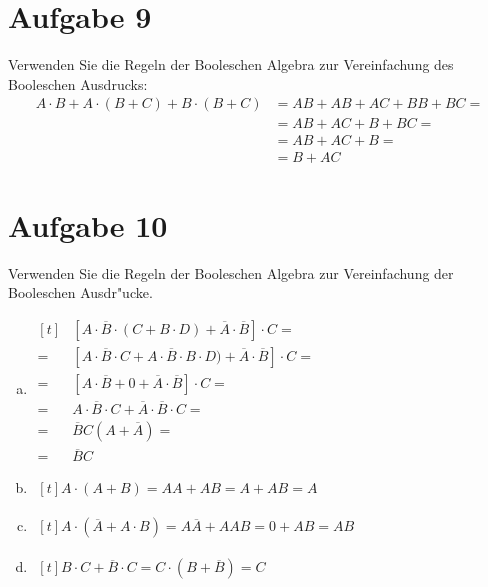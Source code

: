 \documentclass[10pt, oneside]{article}
\begin{document}
\section{Aufgabe 9}

Verwenden Sie die Regeln der Booleschen Algebra zur Vereinfachung des
Booleschen Ausdrucks:
\begin{align*}
    A \cdot B + A \cdot (B + C) + B \cdot (B + C) &= AB + AB + AC + BB + BC = \\
                                                  &= AB + AC + B + BC = \\
                                                  &= AB + AC + B = \\
                                                  &= B + AC
\end{align*}

\pagebreak

\section{Aufgabe 10}

Verwenden Sie die Regeln der Booleschen Algebra zur Vereinfachung der
Booleschen Ausdr"ucke.

\begin{enumerate}[(a)]
    \item $\begin{aligned}[t]
               &[A \cdot \overline{B} \cdot (C + B \cdot D) + \overline{A} \cdot \overline{B}] \cdot C = \\
            =\ &[A \cdot \overline{B} \cdot C + A \cdot \overline{B} \cdot B \cdot D) + \overline{A} \cdot \overline{B}] \cdot C = \\
            =\ &[A \cdot \overline{B} + 0 + \overline{A} \cdot \overline{B}] \cdot C = \\
            =\ &A \cdot \overline{B} \cdot C + \overline{A} \cdot \overline{B} \cdot C = \\
            =\ &\overline{B}C(A + \overline{A}) = \\
            =\ &\overline{B}C
        \end{aligned}$
    \item $\begin{aligned}[t]
            A \cdot (A + B) = AA + AB = A + AB = A
        \end{aligned}$
    \item $\begin{aligned}[t]
            A \cdot (\overline{A} + A \cdot B) = A\overline{A} + AAB = 0 + AB = AB
        \end{aligned}$
    \item $\begin{aligned}[t]
            B \cdot C + \overline{B} \cdot C = C \cdot (B + \overline{B}) = C
        \end{aligned}$
\end{enumerate}
\end{document}
